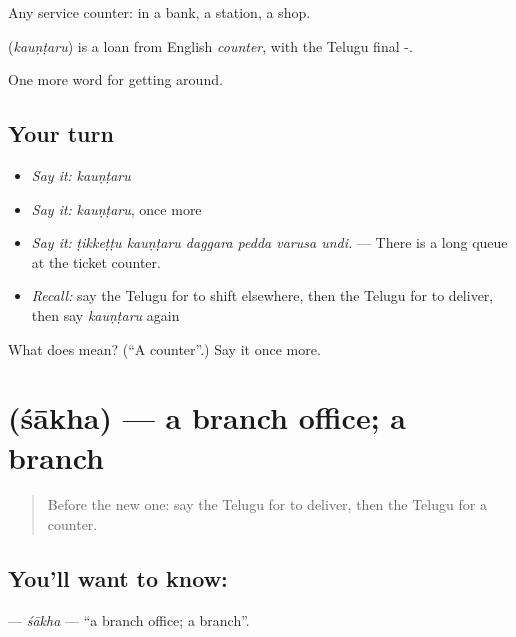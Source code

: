 Any service counter: in a bank, a station, a shop.

\begin{cousinweb}
\textbf{} (\emph{kauṇṭaru}) is a loan from English \emph{counter}, with the Telugu final -.
\end{cousinweb}

\begin{grammarlens}[title={What you've built}]
One more word for getting around.
\end{grammarlens}

\subsection*{Your turn}
\begin{itemize}
\raggedright
  \item \emph{Say it:} \emph{kauṇṭaru}
  \item \emph{Say it:} \emph{kauṇṭaru}, once more
  \item \emph{Say it:} \emph{ṭikkeṭṭu kauṇṭaru daggara pedda varusa undi.} — There is a long queue at the ticket counter.
  \item \emph{Recall:} say the Telugu for to shift elsewhere, then the Telugu for to deliver, then say \emph{kauṇṭaru} again
\end{itemize}

\begin{tcolorbox}[breakable,colback=teal!4,colframe=teal!35!black,title={Before you move on}]
What does  mean? (\textquotedblleft{}A counter\textquotedblright{}.) Say it once more.
\end{tcolorbox}
\section[\texorpdfstring{\te{శాఖ} (śākha)}{శాఖ (śākha)}]{ (śākha) — a branch office; a branch}

\label{lesson:TE-C462-sakha}



\begin{quote}
Before the new one: say the Telugu for to deliver, then the Telugu for a counter.
\end{quote}

\subsection*{You'll want to know: }
\textbf{} — \emph{śākha} — \textquotedblleft{}a branch office; a branch\textquotedblright{}.

